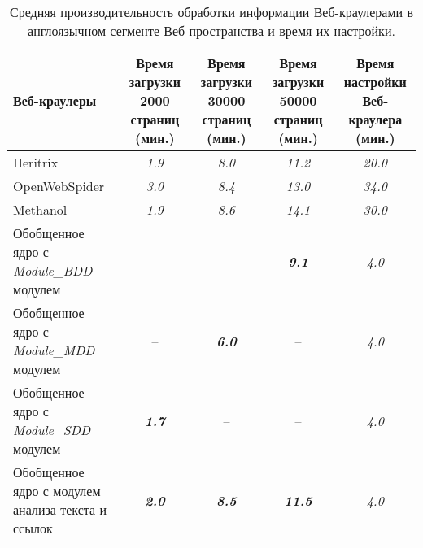 \begin{table} [htbp]%
	\centering
	\caption{Средняя производительность обработки информации Веб-краулерами в англоязычном сегменте Веб-пространства и время их настройки.}%
	\label{tab:crawlersEnglish}%
	\renewcommand{\arraystretch}{1.5}%
	\begin{SingleSpace}
		\begin{tabulary}{\textwidth}{@{}>{\zz}L >{\zz}C >{\zz}C >{\zz}C >{\zz}C@{}}%
			\toprule     %
			Веб-краулеры & Время загрузки 2000 страниц (мин.) & Время загрузки 30000 страниц (мин.) & Время загрузки 50000 страниц (мин.) & Время настройки Веб-краулера (мин.) \\
			\midrule %
			Heritrix & \textit{1.9} & \textit{8.0} & \textit{11.2} & \textit{20.0} \\				
			OpenWebSpider & \textit{3.0} & \textit{8.4} & \textit{13.0} & \textit{34.0} \\
			Methanol & \textit{1.9} & \textit{8.6} & \textit{14.1} & \textit{30.0} \\			
			Обобщенное ядро с \textit{Module\_BDD} модулем & -- & -- & \textbf{\textit{9.1}} & \textit{4.0}\\
			Обобщенное ядро с \textit{Module\_MDD} модулем & -- & \textbf{\textit{6.0}} & -- & \textit{4.0}\\			
			Обобщенное ядро с \textit{Module\_SDD} модулем & \textbf{\textit{1.7}} & -- & -- & \textit{4.0}\\		
			Обобщенное ядро с модулем анализа текста и ссылок & \textbf{\textit{2.0}} & \textbf{\textit{8.5}} & \textbf{\textit{11.5}} & \textit{4.0}\\		
			\bottomrule %
		\end{tabulary}%
	\end{SingleSpace}
\end{table}

